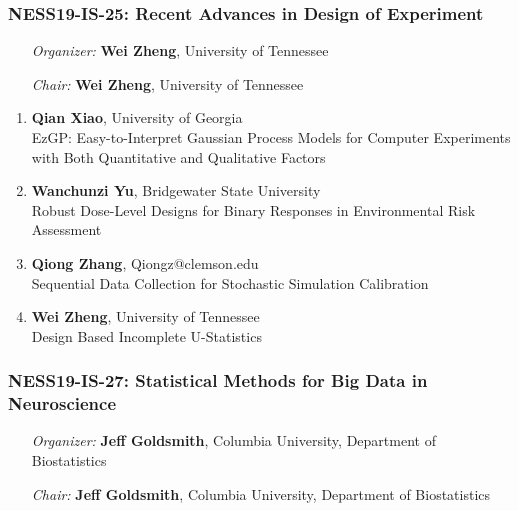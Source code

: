 \subsubsection*{NESS19-IS-25: Recent Advances in Design of Experiment}

\begin{enumerate}[align=left]
\item [\emph{Organizer:}] \textbf{Wei Zheng}, University of Tennessee \\
\item [\emph{Chair:}] \textbf{Wei Zheng}, University of Tennessee
\end{enumerate}

\begin{enumerate}
\item \textbf{Qian Xiao}, University of Georgia \\
EzGP: Easy-to-Interpret Gaussian Process Models for Computer Experiments with Both Quantitative and Qualitative Factors
\item \textbf{Wanchunzi Yu}, Bridgewater State University \\
Robust Dose-Level Designs for Binary Responses in Environmental Risk Assessment
\item \textbf{Qiong Zhang}, Qiongz@clemson.edu \\
Sequential Data Collection for Stochastic Simulation Calibration
\item \textbf{Wei Zheng}, University of Tennessee \\
Design Based Incomplete U-Statistics
\end{enumerate}

\subsubsection*{NESS19-IS-27: Statistical Methods for Big Data in Neuroscience}

\begin{enumerate}[align=left]
\item [\emph{Organizer:}] \textbf{Jeff Goldsmith}, Columbia University, Department of Biostatistics \\
\item [\emph{Chair:}] \textbf{Jeff Goldsmith}, Columbia University, Department of Biostatistics
\end{enumerate}

